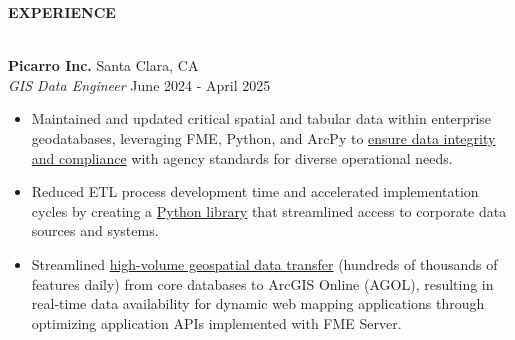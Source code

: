 \documentclass[letterpaper]{article}
\newcommand{\lineunder} {
        \vspace*{-8pt} \\
        \hspace*{-18pt} \hrulefill \\
    }
\newcommand{\header} [1] {
        \vspace{9pt}
        {\hspace*{-18pt}\vspace*{6pt} \large \textbf {#1}}
        \vspace*{-6pt} \lineunder
        \vspace{2pt}
    }
\newcommand{\employer}[4]{
        \vspace{3pt}
        \textbf{#1}  %
        \hfill #2\\  %
        \textit{#3}  %
        \hfill #4\\  %
        \vspace{3mm}
    }
\newenvironment{jobtasklist}
        {
            \vspace{-12pt}
            \begin{itemize} \itemsep 0pt
        }{
            \end{itemize}
            \vspace{-3pt}
        }
\newcommand{\impt}[1]{\uline{#1}}
\begin{document}
\header{EXPERIENCE}



\employer
    {Picarro Inc.}
    {Santa Clara, CA}
    {GIS Data Engineer}
    {June 2024 - April 2025}

\begin{jobtasklist}
    \item Maintained and updated critical spatial and tabular data within enterprise geodatabases,
            leveraging FME, Python, and ArcPy to \impt{ensure data integrity and compliance} with agency standards for
            diverse operational needs.
    \item Reduced ETL process development time and accelerated implementation cycles by
            creating a \impt{Python library} that streamlined access to corporate data sources and systems.
    \item Streamlined \impt{high-volume geospatial data transfer} (hundreds of thousands of features daily) 
            from core databases to ArcGIS Online (AGOL), 
            resulting in real-time data availability for dynamic web mapping applications 
            through optimizing application APIs implemented with FME Server.

\end{jobtasklist}
\end{document}
